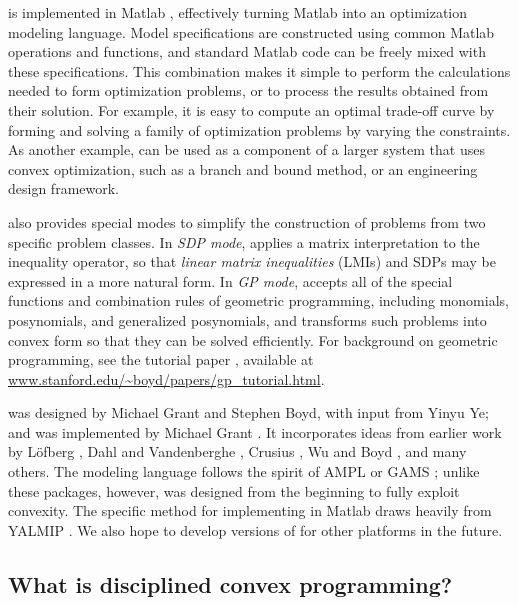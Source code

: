 \documentclass[12pt]{article}
\begin{document}
\cvx is implemented in Matlab \cite{MATLAB}, effectively
turning Matlab into an optimization modeling language.
Model specifications are constructed using common Matlab
operations and functions, and standard Matlab code can be
freely mixed with these specifications. This combination
makes it simple to perform the calculations
needed to form optimization problems, or to process the
results obtained from their solution. For example, it is easy
to compute an optimal trade-off curve
by forming and solving a family of optimization problems
by varying the constraints. As another example, \cvx can
be used as a component of a larger system that uses convex
optimization, such as a branch and bound method,
or an engineering design framework.

\cvx also provides special modes to simplify 
the construction of problems
from two specific problem classes. In \emph{SDP mode}, \cvx applies
a matrix interpretation to the inequality operator, so that
\emph{linear matrix inequalities} (LMIs) and SDPs may be expressed
in a more natural form. In \emph{GP mode}, \cvx accepts all of the
special functions and combination rules of geometric programming,
including monomials, posynomials, and generalized posynomials,
and transforms such problems into convex form
so that they can be solved efficiently.
For background on geometric programming, see the tutorial paper
\cite{BKVH:05}, available
at \url{www.stanford.edu/~boyd/papers/gp_tutorial.html}.

\cvx was designed by Michael Grant and Stephen Boyd, with input from
Yinyu Ye; and was implemented by Michael Grant \cite{GBY}. It
incorporates ideas from earlier work by 
L\"{o}fberg \cite{YALMIP}, 
Dahl and Vandenberghe \cite{CVXOPT}, 
Crusius \cite{Cru:02}, 
Wu and Boyd \cite{SDPSOL},
and many others.
The modeling language follows
the spirit of AMPL \cite{AMPL} or GAMS \cite{GAMS}; unlike
these packages, however, \cvx was designed from the beginning 
to fully exploit convexity.
The specific method for implementing \cvx in Matlab
draws heavily from YALMIP \cite{YALMIP}. We also hope
to develop versions of \cvx for other platforms in the future.

\subsection{What is disciplined convex programming?}
\label{sec:what-is-dcp}
\end{document}
